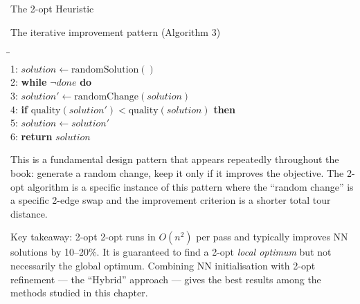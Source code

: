 \documentclass[aspectratio=169,10pt]{beamer}
\begin{document}
\begin{frame}[allowframebreaks]{The 2-opt Heuristic}
  \begin{block}{The iterative improvement pattern (Algorithm 3)}
    \begin{tabbing}
      \hspace{2em}\=\hspace{2em}\=\hspace{2em}\= \\
      1: \> $\mathit{solution} \leftarrow \mathrm{randomSolution}()$ \\
      2: \> \textbf{while} $\neg \mathit{done}$ \textbf{do} \\
      3: \>\> $\mathit{solution'} \leftarrow \mathrm{randomChange}(\mathit{solution})$ \\
      4: \>\> \textbf{if} $\mathrm{quality}(\mathit{solution'}) < \mathrm{quality}(\mathit{solution})$ \textbf{then} \\
      5: \>\>\> $\mathit{solution} \leftarrow \mathit{solution'}$ \\
      6: \> \textbf{return} $\mathit{solution}$
    \end{tabbing}
  \end{block}

  This is a fundamental design pattern that appears repeatedly
  throughout the book: generate a random change, keep it only if it
  improves the objective.  The 2-opt algorithm is a specific instance
  of this pattern where the ``random change'' is a specific 2-edge swap
  and the improvement criterion is a shorter total tour distance.

  \begin{alertblock}{Key takeaway: 2-opt}
    2-opt runs in $O(n^2)$ per pass and typically improves NN solutions
    by 10--20\%.  It is guaranteed to find a 2-opt \emph{local optimum}
    but not necessarily the global optimum.  Combining NN initialisation
    with 2-opt refinement --- the ``Hybrid'' approach --- gives the best
    results among the methods studied in this chapter.
  \end{alertblock}

\end{frame}
\end{document}
